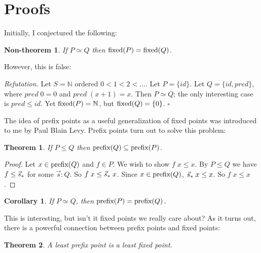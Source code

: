 \documentclass{article}
\newcommand{\N}{\mathbb{N}}
\newcommand{\todo}[1]{{\color{red}{#1}}}
\newtheorem{theorem}{Theorem}
\newtheorem{corollary}{Corollary}
\newtheorem{nontheorem}{Non-theorem}
\newenvironment{refutation}
  {\vspace{0.5em}\noindent\textit{Refutation.}}
  {\hfill$\square$\vspace{0.5em}}
\begin{document}

\section{Proofs}

Initially, I conjectured the following:

\begin{nontheorem}
  If $P \simeq Q$ then $\text{fixed}(P) = \text{fixed}(Q)$.
\end{nontheorem}

However, this is false:

\begin{refutation}
  Let $S = \N$ ordered $0 < 1 < 2 < ...$. Let $P = \{id\}$. Let $Q = \{id,
  pred\}$, where $pred\; 0 = 0$ and $pred\; (x+1) = x$. Then $P \simeq Q$; the
  only interesting case is $pred \le id$. Yet $\fixed{P} = \N$, but $\text{fixed}(Q) =
  \{0\}$.
\end{refutation}

The idea of prefix points as a useful generalization of fixed points was
introduced to me by Paul Blain Levy. Prefix points turn out to solve this
problem:

\begin{theorem}
  If $P \le Q$ then $\text{prefix}(Q) \subseteq \text{prefix}(P)$.
  \label{thm:prefix-antitone}
\end{theorem}

\begin{proof}
  Let $x \in \text{prefix}(Q)$ and $f \in P$. We wish to show $f\;x \le x$. By $P \le
  Q$ we have $f \le {\vec{s}_*}$ for some $\vec{s} : Q$. So $f\;x \le {\vec{s}_*}\;x$.
  Since $x \in \text{prefix}(Q)$, ${\vec{s}_*}\;x \le x$. So $f\; x \le x$.
\end{proof}

\todo{Maybe the ordering on programs is the opposite of what it should be?}

\begin{corollary}
  If $P \simeq Q$, then $\text{prefix}(P) = \text{prefix}(Q)$.
  \label{cor:simeq->prefix}
\end{corollary}

This is interesting, but isn't it fixed points we really care about? As it turns
out, there is a powerful connection between prefix points and fixed points:

\begin{theorem}
  A least prefix point is a least fixed point.
\end{theorem}
\end{document}
